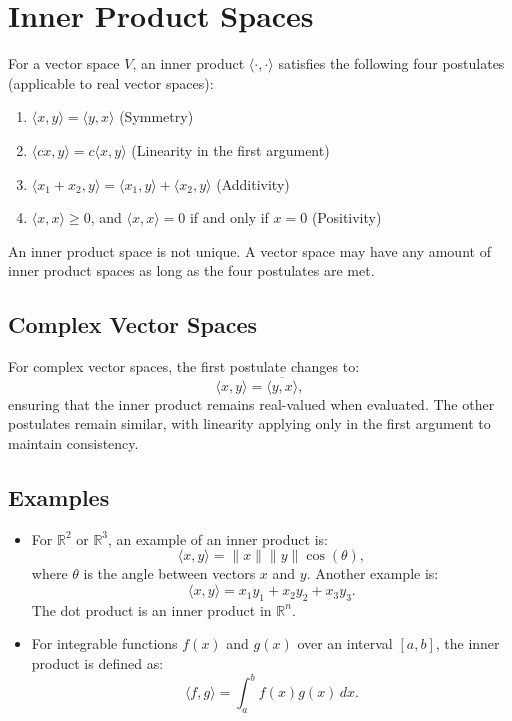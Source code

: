 \documentclass[12pt]{article}
\begin{document}
\section*{Inner Product Spaces}

For a vector space \( V \), an inner product \(\langle \cdot, \cdot \rangle\) satisfies the following four postulates (applicable to real vector spaces):

\begin{enumerate}
    \item \(\langle x, y \rangle = \langle y, x \rangle\) \hfill (Symmetry)
    \item \(\langle cx, y \rangle = c \langle x, y \rangle\) \hfill (Linearity in the first argument)
    \item \(\langle x_1 + x_2, y \rangle = \langle x_1, y \rangle + \langle x_2, y \rangle\) \hfill (Additivity)
    \item \(\langle x, x \rangle \geq 0\), and \(\langle x, x \rangle = 0\) if and only if \( x = 0 \) \hfill (Positivity)
\end{enumerate}
An inner product space is not unique. A vector space may have any amount of inner product spaces as long as the four postulates are met. 

\subsection*{Complex Vector Spaces}
For complex vector spaces, the first postulate changes to:
\[
\langle x, y \rangle = \overline{\langle y, x \rangle},
\]
ensuring that the inner product remains real-valued when evaluated. The other postulates remain similar, with linearity applying only in the first argument to maintain consistency.

\subsection*{Examples}
\begin{itemize}
    \item For \(\mathbb{R}^2\) or \(\mathbb{R}^3\), an example of an inner product is:
    \[
    \langle x, y \rangle = \|x\| \|y\| \cos(\theta),
    \]
    where \(\theta\) is the angle between vectors \( x \) and \( y \). Another example is:
    \[
    \langle x, y \rangle = x_1 y_1 + x_2 y_2 + x_3 y_3.
    \]
    The dot product is an inner product in \(\mathbb{R}^n\).

    \item For integrable functions \( f(x) \) and \( g(x) \) over an interval \([a, b]\), the inner product is defined as:
    \[
    \langle f, g \rangle = \int_a^b f(x) g(x) \, dx.
    \]
\end{itemize}
\end{document}
